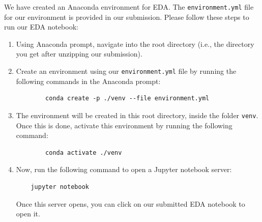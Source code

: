 \documentclass[conference]{IEEEtran}
\begin{document}
We have created an Anaconda environment for EDA. The \texttt{environment.yml} file
for our environment is provided in our submission. Please follow these steps to
run our EDA notebook:
\begin{enumerate}
    \item Using Anaconda prompt, navigate into the root directory (i.e., the
    directory you get after unzipping our submission).
    \item Create an environment using our \texttt{environment.yml} file by running
    the following commands in the Anaconda prompt:
    \begin{verbatim}
        conda create -p ./venv --file environment.yml
    \end{verbatim}
    \item The environment will be created in this root directory, inside the
    folder \texttt{venv}. Once this is done, activate this environment by running
    the following command:
    \begin{verbatim}
        conda activate ./venv
    \end{verbatim}
    \item Now, run the following command to open a Jupyter notebook server:
    \begin{verbatim}
    jupyter notebook
    \end{verbatim}
    Once this server opens, you can click on our submitted EDA notebook to open
    it.
\end{enumerate}
\end{document}
